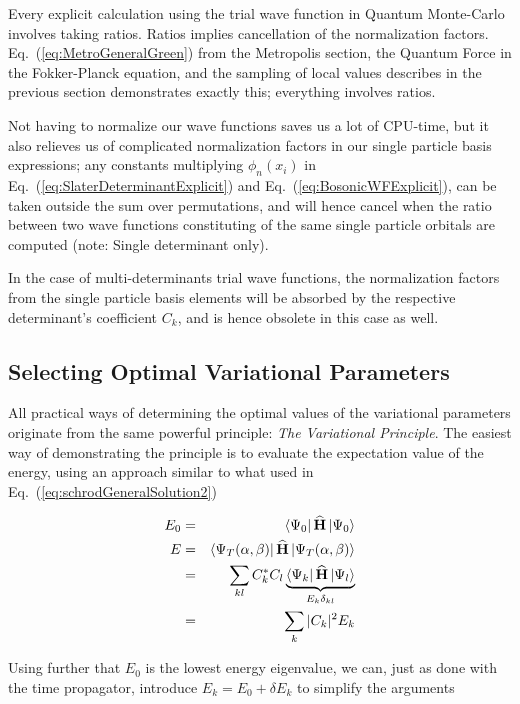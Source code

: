 Every explicit calculation using the trial wave function in Quantum Monte-Carlo involves taking ratios. Ratios implies cancellation of the normalization factors. Eq.~(\ref{eq:MetroGeneralGreen}) from the Metropolis section, the Quantum Force in the Fokker-Planck equation, and the sampling of local values describes in the previous section demonstrates exactly this; everything involves ratios.

Not having to normalize our wave functions saves us a lot of CPU-time, but it also relieves us of complicated normalization factors in our single particle basis expressions; any constants multiplying $\phi_n(x_i)$ in Eq.~(\ref{eq:SlaterDeterminantExplicit}) and Eq.~(\ref{eq:BosonicWFExplicit}), can be taken outside the sum over permutations, and will hence cancel when the ratio between two wave functions constituting of the same single particle orbitals are computed (note: Single determinant only). 

In the case of multi-determinants trial wave functions, the normalization factors from the single particle basis elements  will be absorbed by the respective determinant's coefficient $C_k$, and is hence obsolete in this case as well.


\subsection{Selecting Optimal Variational Parameters}
\label{sec:selectingOptVarPar}

All practical ways of determining the optimal values of the variational parameters originate from the same powerful principle: \textit{The Variational Principle}. The easiest way of demonstrating the principle is to evaluate the expectation value of the energy, using an approach similar to what used in Eq.~(\ref{eq:schrodGeneralSolution2})

\begin{eqnarray*}
 E_0 &=& \left< \Psi_0 \right|{\bf\widehat{H}}\left| \Psi_0 \right>  \\
 E   &=& \left< \Psi_T(\alpha, \beta) \right|{\bf\widehat{H}}\left| \Psi_T(\alpha, \beta) \right>\\
     &=& \sum_{kl} C_k^\ast C_l \underbrace{\left< \Psi_k \right|{\bf\widehat{H}}\left| \Psi_l \right>}_{E_k\delta_{kl}} \\
     &=& \sum_k |C_k|^2E_k
\end{eqnarray*}

Using further that $E_0$ is the lowest energy eigenvalue, we can, just as done with the time propagator, introduce $E_k = E_0 + \delta E_k$ to simplify the arguments

